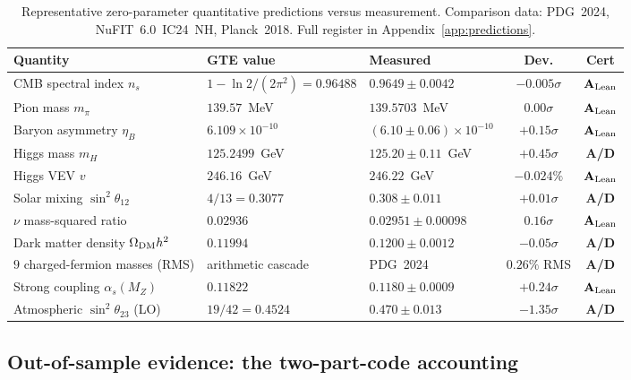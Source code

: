 \documentclass[11pt]{article}
\newcommand{\CatAL}{\ensuremath{\textbf{A}_{\rm Lean}}}
\newcommand{\CatAD}{\textbf{A/D}}
\begin{document}
\begin{table}[htbp]
\centering
\caption{Representative zero-parameter quantitative predictions versus measurement.
Comparison data: PDG~2024, NuFIT~6.0~IC24~NH, Planck~2018.  Full register in
Appendix~\ref{app:predictions}.}
\label{tab:tiered}
\small\renewcommand{\arraystretch}{1.2}
\begin{tabularx}{\textwidth}{@{}P{4.4cm}P{3.4cm}P{3.4cm}cc@{}}
\toprule
\textbf{Quantity} & \textbf{GTE value} & \textbf{Measured} & \textbf{Dev.} & \textbf{Cert} \\
\midrule
CMB spectral index $n_s$ & $1-\ln 2/(2\pi^2)=0.96488$ & $0.9649\pm0.0042$ & $-0.005\sigma$ & \CatAL \\
Pion mass $m_\pi$ & $139.57$~MeV & $139.5703$~MeV & $0.00\sigma$ & \CatAL \\
Baryon asymmetry $\eta_B$ & $6.109\times10^{-10}$ & $(6.10\pm0.06)\times10^{-10}$ & $+0.15\sigma$ & \CatAL \\
Higgs mass $m_H$ & $125.2499$~GeV & $125.20\pm0.11$~GeV & $+0.45\sigma$ & \CatAD \\
Higgs VEV $v$ & $246.16$~GeV & $246.22$~GeV & $-0.024\%$ & \CatAL \\
Solar mixing $\sin^2\theta_{12}$ & $4/13 = 0.3077$ & $0.308\pm0.011$ & $+0.01\sigma$ & \CatAD \\
$\nu$ mass-squared ratio & $0.02936$ & $0.02951\pm0.00098$ & $0.16\sigma$ & \CatAL \\
Dark matter density $\Omega_{\rm DM}h^2$ & $0.11994$ & $0.1200\pm0.0012$ & $-0.05\sigma$ & \CatAD \\
$9$ charged-fermion masses (RMS) & arithmetic cascade & PDG~2024 & $0.26\%$ RMS & \CatAD \\
Strong coupling $\alpha_s(M_Z)$ & $0.11822$ & $0.1180\pm0.0009$ & $+0.24\sigma$ & \CatAL \\
Atmospheric $\sin^2\theta_{23}$ (LO) & $19/42 = 0.4524$ & $0.470\pm0.013$ & $-1.35\sigma$ & \CatAD \\
\bottomrule
\end{tabularx}
\end{table}

\FloatBarrier

\subsection{Out-of-sample evidence: the two-part-code accounting}
\end{document}
